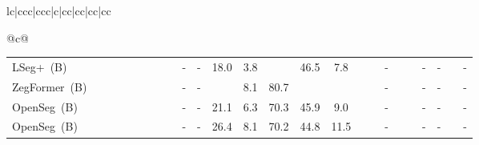 \documentclass[10pt,twocolumn,letterpaper]{article}
\begin{document}
\begin{table*}[!ht]
{\begin{tabular}{lc|ccc|ccc|c|cc|cc|cc|cc}
{\begin{tabular}[c]{@{}c@{}}
\begin{table*}
{\begin{tabular}{lccccccc|cccccccccccccccc}
LSeg+~(B)~\cite{li2022language}                                              & \cmark & \cmark   & \xmark                    & \xmark                    & \cmark                    & \cmark                   & \xmark                                                                  & -                                        & -                                        & 18.0          & 3.8                                     &                                         & 46.5          & 7.8           &              &              & -             &              &              & -                                        & -                                        &              & -              \\
ZegFormer~(B)~\cite{hendricks2021decoupling}                                          & \cmark & \cmark   & \xmark                    & \xmark                    & \cmark                    & \cmark                   & \xmark                                                                  & -                                        & -                                        &              & \textcolor[rgb]{0.855,0.835,0.965}{8.1} & \textcolor[rgb]{0.855,0.835,0.965}{80.7} &              &              &              &              & -             &              &              & -                                        & -                                        &              & -              \\
OpenSeg~(B)~\cite{gu2021open}                                            & \cmark & \xmark   & \cmark                    & \xmark                    & \cmark                    & \cmark                   & \cmark                                                                  & -                                        & -                                        & 21.1          & 6.3                                     & 70.3                                     & 45.9          & 9.0           &              &              & -             &              &              & -                                        & -                                        &              & -              \\
OpenSeg~(B)~\cite{gu2021open}                                            & \cmark & \xmark   & \cmark                    & \cmark                    & \cmark                    & \cmark                   & \cmark                                                                  & -                                        & -                                        & 26.4          & 8.1                                     & 70.2                                     & 44.8          & 11.5          &              &              & -             &              &              & -                                        & -                                        &              & -              \\

\end{tabular}}
\end{table*}
\end{tabular}}
\end{tabular}}
\end{table*}
\end{document}
